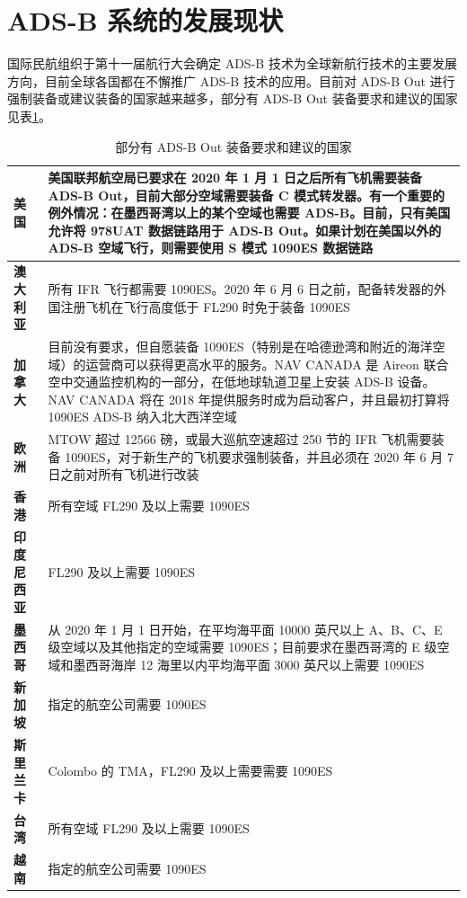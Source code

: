 \section{ADS-B 系统的发展现状}

国际民航组织于第十一届航行大会确定 ADS-B 技术为全球新航行技术的主要发展方向，目前全球各国都在不懈推广 ADS-B 技术的应用。目前对 ADS-B Out 进行强制装备或建议装备的国家越来越多，部分有 ADS-B Out 装备要求和建议的国家见表\ref{tab:Countries_with_ADS-B_Out_mandates_and_proposals}。

\renewcommand\arraystretch{1.5}
\begin{table}[!htb]
\centering
\caption{部分有 ADS-B Out 装备要求和建议的国家\protect\footnotemark}
\label{tab:Countries_with_ADS-B_Out_mandates_and_proposals}
\begin{tabular}[b]{|p{2cm}<{\raggedleft}|p{13cm}<{\raggedright}|}
\hline
\textbf{美国} & 美国联邦航空局已要求在 2020 年 1 月 1 日之后所有飞机需要装备 ADS-B Out，目前大部分空域需要装备 C 模式转发器。有一个重要的例外情况：在墨西哥湾以上的某个空域也需要 ADS-B。目前，只有美国允许将 978UAT 数据链路用于 ADS-B Out。如果计划在美国以外的 ADS-B 空域飞行，则需要使用 S 模式 1090ES 数据链路 \\
\hline
\textbf{澳大利亚} & 所有 \acs{IFR} 飞行都需要 1090ES。2020 年 6 月 6 日之前，配备转发器的外国注册飞机在飞行高度低于 \acs{FL}290 时免于装备 1090ES \\
\hline
\textbf{加拿大} & 目前没有要求，但自愿装备 1090ES（特别是在哈德逊湾和附近的海洋空域）的运营商可以获得更高水平的服务。NAV CANADA 是 Aireon 联合空中交通监控机构的一部分，在低地球轨道卫星上安装 ADS-B 设备。NAV CANADA 将在 2018 年提供服务时成为启动客户，并且最初打算将 1090ES ADS-B 纳入北大西洋空域 \\
\hline
\textbf{欧洲} & \acs{MTOW} 超过 12566 磅，或最大巡航空速超过 250 节的 IFR 飞机需要装备 1090ES，对于新生产的飞机要求强制装备，并且必须在 2020 年 6 月 7 日之前对所有飞机进行改装 \\
\hline
\textbf{香港} & 所有空域 FL290 及以上需要 1090ES \\
\hline
\textbf{印度尼西亚} & FL290 及以上需要 1090ES \\
\hline
\textbf{墨西哥} & 从 2020 年 1 月 1 日开始，在平均海平面 10000 英尺以上 A、B、C、E 级空域以及其他指定的空域需要 1090ES；目前要求在墨西哥湾的 E 级空域和墨西哥海岸 12 海里以内平均海平面 3000 英尺以上需要 1090ES \\
\hline
\textbf{新加坡} & 指定的航空公司需要 1090ES \\
\hline
\textbf{斯里兰卡} & Colombo 的 \acs{TMA}，FL290 及以上需要需要 1090ES \\
\hline
\textbf{台湾} & 所有空域 FL290 及以上需要 1090ES \\
\hline
\textbf{越南} & 指定的航空公司需要 1090ES \\
\hline
\end{tabular}
\end{table}

